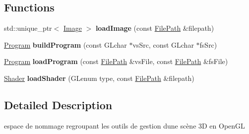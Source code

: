 \subsection*{Functions}
\begin{DoxyCompactItemize}
\item 
\mbox{\label{namespaceglimac_a7d92f451f5235a3299fa0faef1a335f5}} 
std\+::unique\+\_\+ptr$<$ \hyperlink{classglimac_1_1Image}{Image} $>$ {\bfseries load\+Image} (const \hyperlink{classglimac_1_1FilePath}{File\+Path} \&filepath)
\item 
\mbox{\label{namespaceglimac_a3d534d78277f9bab3c4fa83f263f3633}} 
\hyperlink{classglimac_1_1Program}{Program} {\bfseries build\+Program} (const G\+Lchar $\ast$vs\+Src, const G\+Lchar $\ast$fs\+Src)
\item 
\mbox{\label{namespaceglimac_a9c42759cac55f7ef947d2972b19e18a6}} 
\hyperlink{classglimac_1_1Program}{Program} {\bfseries load\+Program} (const \hyperlink{classglimac_1_1FilePath}{File\+Path} \&vs\+File, const \hyperlink{classglimac_1_1FilePath}{File\+Path} \&fs\+File)
\item 
\mbox{\label{namespaceglimac_aa154f6bbc6caafaa2b8aa5e4dc433523}} 
\hyperlink{classglimac_1_1Shader}{Shader} {\bfseries load\+Shader} (G\+Lenum type, const \hyperlink{classglimac_1_1FilePath}{File\+Path} \&filepath)
\end{DoxyCompactItemize}


\subsection{Detailed Description}
espace de nommage regroupant les outils de gestion d\textquotesingle{}une scène 3D en Open\+GL 
